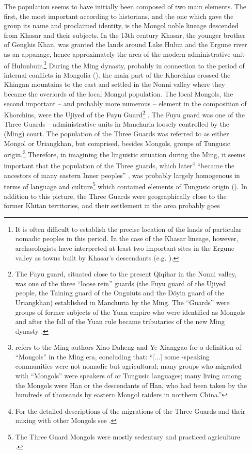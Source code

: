 \documentclass[output=paper,colorlinks,citecolor=brown]{langscibook}
\begin{document}
The  population seems to have initially been composed of two main elements. The first, the most important according to  historians, and the one which gave the group its name and proclaimed identity, is the Mongol noble lineage descended from Khasar and their subjects. In the 13th century Khasar, the younger brother of Genghis Khan, was granted the lands around Lake Hulun and the Ergune river as an appanage, hence approximately the area of the modern administrative unit of Hulunbuir.\footnote{It is often difficult to establish the precise location of the lands of particular nomadic peoples in this period. In the case of the Khasar lineage, however, archaeologists have interpreted at least two important sites in the Ergune valley as towns built by Khasar’s descendants (e.g. \citealt[227--227]{Kradin2018}).} During the Ming dynasty, probably in connection to the period of internal conflicts in Mongolia (\citealt[29]{Caidengduoerji2014}), the main part of the Khorchins crossed the Khingan mountains to the east and settled in the Nonni valley where they became the overlords of the local Mongol population. The local Mongols, the second important – and probably more numerous – element in the composition of Khorchins, were the Ujiyed of the Fuyu Guard\footnote{The Fuyu guard, situated close to the present Qiqihar in the Nonni valley, was one of the three “loose rein” guards (the Fuyu guard of the Ujiyed people, the Taining guard of the Ongniuts and the Döyin guard of the Uriangkhan) established in Manchuria by the Ming. The “Guards” were groups of former subjects of the Yuan empire who were identified as Mongols and after the fall of the Yuan rule became tributaries of the new Ming dynasty \citep[536]{Atwood2004}.} \citep[306]{Atwood2004}. The Fuyu guard was one of the Three Guards – administrative units in Manchuria loosely controlled by the  (Ming) court. The population of the Three Guards was referred to as either Mongol or Uriangkhan, but comprised, besides Mongols, groups of Tungusic origin.\footnote{\citet[64]{Crossley2006} refers to the Ming authors Xiao Daheng and Ye Xianggao for a definition of “Mongols” in the Ming era, concluding that: “[...] some -speaking communities were not nomadic but agricultural; many groups who migrated with “Mongols” were speakers of  or Tungusic languages; many living among the Mongols were Han or the descendants of Han, who had been taken by the hundreds of thousands by eastern Mongol raiders in northern China.”} Therefore, in imagining the linguistic situation during the Ming, it seems important that the population of the Three guards, which later\footnote{For the detailed descriptions of the migrations of the Three Guards and their mixing with other Mongols see \citet[304, 410]{Atwood2004}.} “became the ancestors of many eastern Inner  peoples” \citep[35]{Atwood2004}, was probably largely homogenous in terms of language and culture\footnote{The Three Guard Mongols were mostly sedentary and practiced agriculture \citep[535]{Atwood2004}.} which contained elements of Tungusic origin (\citealt[82]{Crossley2006}). In addition to this picture, the Three Guards were geographically close to the former Khitan territories, and their settlement in the area probably goes 
\end{document}
